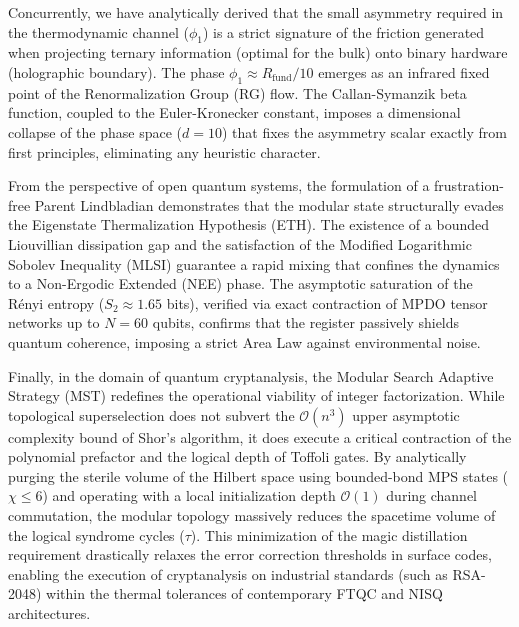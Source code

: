 \documentclass[reprint,aps,pra,superscriptaddress,nofootinbib]{revtex4-2}
\theoremstyle{plain}
\theoremstyle{definition}
\theoremstyle{remark}
\begin{document}
Concurrently, we have analytically derived that the small asymmetry required in the thermodynamic channel ($\phi_1$) is a strict signature of the friction generated when projecting ternary information (optimal for the bulk) onto binary hardware (holographic boundary). The phase $\phi_1 \approx R_{\text{fund}}/10$ emerges as an infrared fixed point of the Renormalization Group (RG) flow. The Callan-Symanzik beta function, coupled to the Euler-Kronecker constant, imposes a dimensional collapse of the phase space ($d=10$) that fixes the asymmetry scalar exactly from first principles, eliminating any heuristic character.

From the perspective of open quantum systems, the formulation of a frustration-free Parent Lindbladian demonstrates that the modular state structurally evades the Eigenstate Thermalization Hypothesis (ETH). The existence of a bounded Liouvillian dissipation gap and the satisfaction of the Modified Logarithmic Sobolev Inequality (MLSI) guarantee a rapid mixing that confines the dynamics to a Non-Ergodic Extended (NEE) phase. The asymptotic saturation of the Rényi entropy ($S_2 \approx 1.65$ bits), verified via exact contraction of MPDO tensor networks up to $N=60$ qubits, confirms that the register passively shields quantum coherence, imposing a strict Area Law against environmental noise.

Finally, in the domain of quantum cryptanalysis, the Modular Search Adaptive Strategy (MST) redefines the operational viability of integer factorization. While topological superselection does not subvert the $\mathcal{O}(n^3)$ upper asymptotic complexity bound of Shor's algorithm, it does execute a critical contraction of the polynomial prefactor and the logical depth of Toffoli gates. By analytically purging the sterile volume of the Hilbert space using bounded-bond MPS states ($\chi \le 6$) and operating with a local initialization depth $\mathcal{O}(1)$ during channel commutation, the modular topology massively reduces the spacetime volume of the logical syndrome cycles ($\tau$). This minimization of the magic distillation requirement drastically relaxes the error correction thresholds in surface codes, enabling the execution of cryptanalysis on industrial standards (such as RSA-2048) within the thermal tolerances of contemporary FTQC and NISQ architectures.
\end{document}
